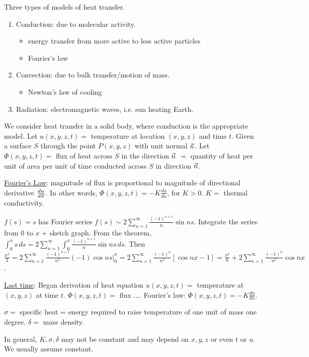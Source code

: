 \documentclass[]{article}
\begin{document}
Three types of models of heat transfer.
\begin{enumerate}
	\item Conduction: due to molecular activity.
	\begin{itemize}
		\item energy transfer from more active to less active particles
		\item Fourier's law
	\end{itemize}
	\item Convection: due to bulk transfer/motion of mass.
	\begin{itemize}
		\item Newton's law of cooling
	\end{itemize}
	\item Radiation: electromagnetic waves, i.e. sun heating Earth.
\end{enumerate}
We consider heat transfer in a solid body, where conduction is the appropriate model.
Let $u(x,y,z,t) = $ temperature at location $(x,y,z)$ and time $t$.
Given a surface $S$ through the point $P(x,y,z)$ with unit normal $\vec{n}$. Let $\Phi(x,y,z,t) = $ flux of heat across $S$ in the direction $\vec{n}$ $ = $ quantity of heat per unit of area per unit of time conducted across $S$ in direction $\vec{n}$.

\begin{definition}
	\underline{Fourier's Law}: magnitude of flux is proportional to magnitude of directional derivative $\frac{du}{d\vec{n}}$.
	In other words, $\Phi(x,y,z,t) = -K \frac{du}{dn}$, for $K>0$. $K = $ thermal conductivity.
\end{definition}

\begin{example}
	 $f(s) = s $ has Fourier series $f(s) \sim 2\sum_{n=1}^\infty \frac{(-1)^{n+1}}{n}\sin{ns}$. Integrate the series from 0 to $x$ + sketch graph. From the theorem, $\int_0^x s\, ds = 2 \sum_{n=1}^\infty \int_0^x \frac{(-1)^{n+1}}{n} \sin{ns} \, ds$. Then $\frac{x^2}{2} = 2\sum_{n=1}^\infty \frac{(-1)^{n+1}}{n^2}(-1)\cos{ns} \big\rvert_0^x = 2\sum_{n=1}^\infty \frac{(-1)^n}{n^2} [\cos{nx}-1] = \frac{\pi^2}{6} + 2\sum_{n=1}^\infty \frac{(-1)^n}{n^2}\cos{nx} $.
\end{example}

\underline{Last time}: Began derivation of heat equation $u(x,y,z,t) = $ temperature at $(x,y,z)$ at time $t$. $\Phi(x,y,z,t) = $ flux $\dots$.
Fourier's law: $\Phi(x,y,z,t) = -K \frac{du}{dn}$.

\begin{definition}
	$\sigma = $ specific heat = energy required to raise temperature of one unit of mass one degree.
	$\delta = $ mass density.
	\begin{note}
		In general, $K,\sigma,\delta$ may not be constant and may depend on $x,y,z$ or even $t$ or $u$. We usually assume constant.
	\end{note}
\end{definition}
\end{document}
